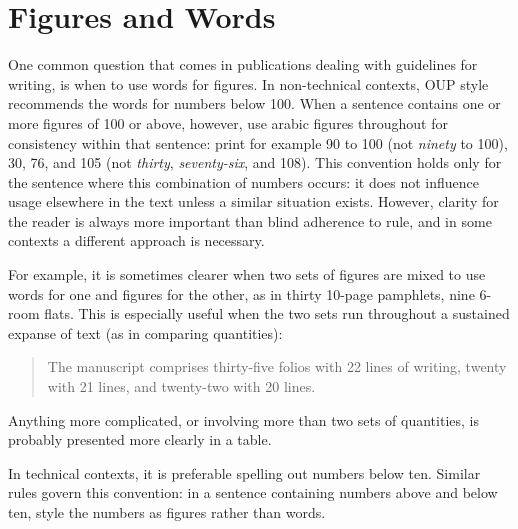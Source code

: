 \begin{comment}
\begin{texexample}{Lining and Old style Numerals}{oldstyle}
\bgroup
\def\temp{
\fontspec[Numbers=Lining]{TeX Gyre Bonum}
0123456789

\fontspec[Numbers=SlashedZero]{TeX Gyre Bonum}
0123456789

\fontspec[Numbers=OldStyle]{TeX Gyre Bonum}
abcde 0123456789
}
\ifxetex 
\temp
\else
  abcde \oldstylenums{0123456789}
\fi
\egroup
\end{texexample}
\end{comment}

\section{Figures and Words}

One common question that comes in publications dealing with guidelines for writing, is when to use words for figures. In non-technical contexts, OUP style recommends the words for numbers below
100. When a sentence contains one or more figures of 100 or above,
however, use arabic figures throughout for consistency within that
sentence: print for example 90 to 100 (not \textit{ninety} to 100), 30, 76, and 105
(not \textit{thirty}, \textit{seventy-six}, and 108). This convention holds only for the sentence
where this combination of numbers occurs: it does not influence
usage elsewhere in the text unless a similar situation exists.
However, clarity for the reader is always more important than blind adherence
to rule, and in some contexts a different approach is necessary. 

For example, it is sometimes clearer when two sets of figures are mixed to
use words for one and figures for the other, as in thirty 10-page pamphlets,
nine 6-room flats. This is especially useful when the two sets run throughout
a sustained expanse of text (as in comparing quantities):
\begin{quote}
The manuscript comprises thirty-five folios with 22 lines of writing, twenty
with 21 lines, and twenty-two with 20 lines.
\end{quote}

Anything more complicated, or involving more than two sets of quantities,
is probably presented more clearly in a table.

In technical contexts, it is preferable  spelling out numbers below
ten. Similar rules govern this convention: in a sentence containing
numbers above and below ten, style the numbers as figures rather
than words.

